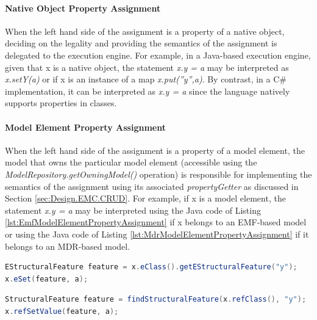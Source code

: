 \paragraph{Native Object Property Assignment}

When the left hand side of the assignment is a property of a native object, deciding on the legality and providing the semantics of the assignment is delegated to the execution engine. For example, in a Java-based execution engine, given that x is a native object, the statement \emph{x.y = a} may be interpreted as \emph{x.setY(a)} or if x is an instance of a map \emph{x.put(''y'',a)}. By contrast, in a C\# implementation, it can be interpreted as \emph{x.y = a} since
the language natively supports properties in classes.

\paragraph{Model Element Property Assignment}

When the left hand side of the assignment is a property of a model element, the model that owns the particular model element (accessible using the \emph{ModelRepository.getOwningModel() }operation) is responsible for implementing the semantics of the assignment using its associated \emph{propertyGetter} as discussed in Section \ref{sec:Design.EMC.CRUD}. For example, if x is a model element, the statement \emph{x.y = a} may be interpreted using the Java code of Listing \ref{lst:EmfModelElementPropertyAssignment} if x belongs to an EMF-based model or using the Java code of Listing \ref{lst:MdrModelElementPropertyAssignment} if it belongs to an MDR-based model.

\begin{lstlisting}[float=h, caption=Java code that assigns the value of a property of a model element that belongs to an EMF-based model, label=lst:EmfModelElementPropertyAssignment, language=Java]
EStructuralFeature feature = x.eClass().getEStructuralFeature("y");
x.eSet(feature, a);
\end{lstlisting}

\begin{lstlisting}[float=h, caption=Java code that assigns the value of a property of a model element that belongs to an MDR-based model, label=lst:MdrModelElementPropertyAssignment, language=Java]
StructuralFeature feature = findStructuralFeature(x.refClass(), "y");
x.refSetValue(feature, a);
\end{lstlisting}

